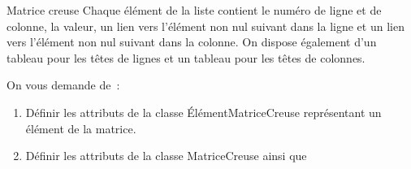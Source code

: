 \begin{Exercice}{Matrice creuse}
		Chaque élément de la liste contient le numéro de ligne et 
		de colonne, la valeur, un lien vers l'élément non nul suivant
		dans la ligne et un lien vers l'élément non nul suivant dans 
		la colonne. On dispose également d'un tableau pour les
		têtes de lignes et un tableau pour les têtes de colonnes.

		On vous demande de~:

		\begin{enumerate}
			\item 
				Définir les attributs de la classe ÉlémentMatriceCreuse représentant un élément de la matrice.
			\item 
				Définir les attributs de la classe MatriceCreuse ainsi que
		
		\end{enumerate}
	\end{Exercice}

